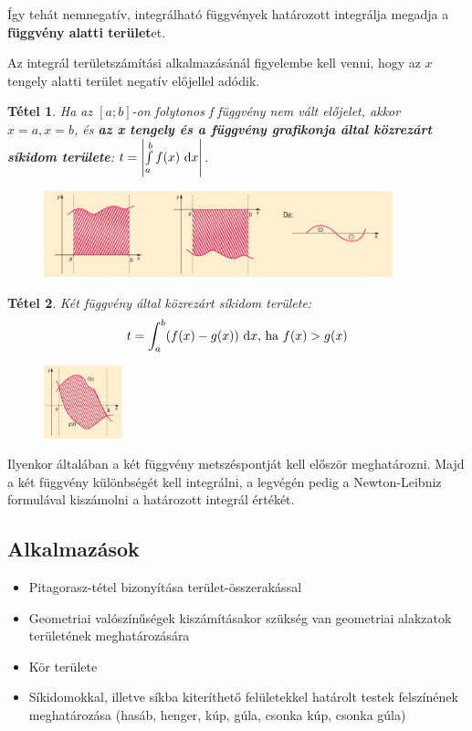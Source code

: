 \documentclass[12pt,a4paper]{article}
\newtheorem{theorem}{Tétel} [section]
\begin{document}
Így tehát nemnegatív, integrálható függvények határozott integrálja megadja a \textbf{függvény alatti terület}et.

Az integrál területszámítási alkalmazásánál figyelembe kell venni, hogy az $x$ tengely alatti terület negatív előjellel adódik.

\begin{theorem}
Ha az $[a; b]$-on folytonos f függvény nem vált előjelet, akkor $x = a, x = b$, és \textbf{az x tengely és a függvény grafikonja által közrezárt síkidom területe}: $t=\left|\int\limits_a^bf(x){\normalfont\text{ d}}x \right|$.
\begin{figure}[h]
\centering
\includegraphics[width=0.9\textwidth]{gorbe_alatti_terulet_integral}
\end{figure}
\end{theorem}
\newpage
\begin{theorem}
Két függvény által közrezárt síkidom területe:
$$t=\int_a^b(f(x)-g(x)) {\normalfont\text{ d}}x \text{, ha }f(x)>g(x)$$
\begin{figure}[h]
\centering
\includegraphics[width=0.2\textwidth]{alakzat_terulete_integral}
\end{figure}
\end{theorem}
Ilyenkor általában a két függvény metszéspontját kell először meghatározni. Majd a két függvény különbségét kell integrálni, a legvégén pedig a Newton-Leibniz formulával kiszámolni a határozott integrál értékét.

\subsection{Alkalmazások}
\begin{itemize}
\item Pitagorasz-tétel bizonyítása terület-összerakással
\item Geometriai valószínűségek kiszámításakor szükség van geometriai alakzatok területének meghatározására
\item Kör területe
\item  Síkidomokkal, illetve síkba kiteríthető felületekkel határolt testek felszínének meghatározása (hasáb, henger, kúp, gúla, csonka kúp, csonka gúla)
\end{itemize}
\newpage
\end{document}
